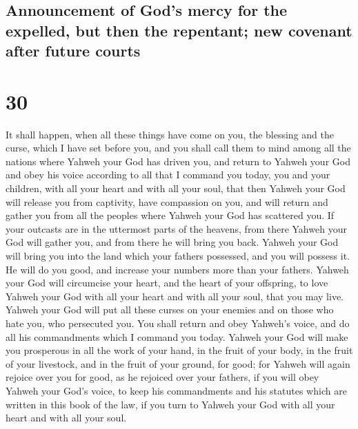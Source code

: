 \hypertarget{announcement-of-gods-mercy-for-the-expelled-but-then-the-repentant-new-covenant-after-future-courts}{%
\subsection{Announcement of God's mercy for the expelled, but then the
repentant; new covenant after future
courts}\label{announcement-of-gods-mercy-for-the-expelled-but-then-the-repentant-new-covenant-after-future-courts}}

\hypertarget{section-29}{%
\section{30}\label{section-29}}

 It shall happen, when all these things have come on you,
the blessing and the curse, which I have set before you, and you shall
call them to mind among all the nations where Yahweh your God has driven
you,  and return to Yahweh your God and obey his voice
according to all that I command you today, you and your children, with
all your heart and with all your soul,  that then Yahweh
your God will release you from captivity, have compassion on you, and
will return and gather you from all the peoples where Yahweh your God
has scattered you.  If your outcasts are in the uttermost
parts of the heavens, from there Yahweh your God will gather you, and
from there he will bring you back.  Yahweh your God will
bring you into the land which your fathers possessed, and you will
possess it. He will do you good, and increase your numbers more than
your fathers.  Yahweh your God will circumcise your heart,
and the heart of your offspring, to love Yahweh your God with all your
heart and with all your soul, that you may live.  Yahweh
your God will put all these curses on your enemies and on those who hate
you, who persecuted you.  You shall return and obey
Yahweh's voice, and do all his commandments which I command you today.
 Yahweh your God will make you prosperous in all the work
of your hand, in the fruit of your body, in the fruit of your livestock,
and in the fruit of your ground, for good; for Yahweh will again rejoice
over you for good, as he rejoiced over your fathers,  if
you will obey Yahweh your God's voice, to keep his commandments and his
statutes which are written in this book of the law, if you turn to
Yahweh your God with all your heart and with all your soul.

